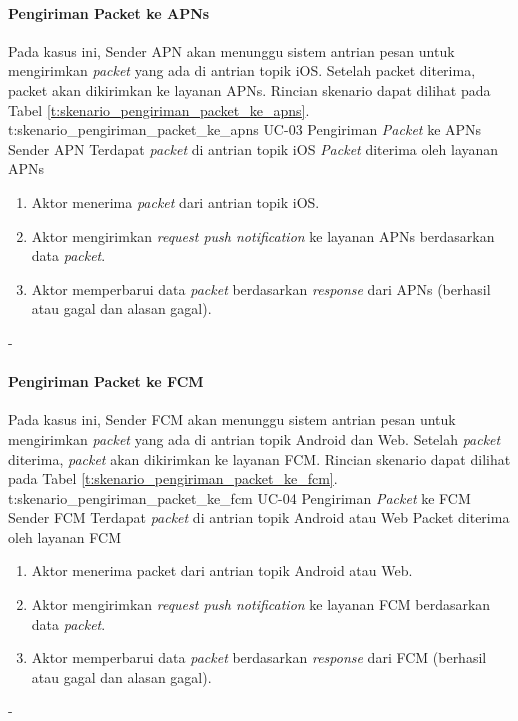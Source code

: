 \paragraph{Pengiriman Packet ke APNs}
\par Pada kasus ini, Sender APN akan menunggu sistem antrian pesan untuk mengirimkan \textit{packet} yang ada di antrian topik iOS. Setelah packet diterima, packet akan dikirimkan ke layanan APNs. Rincian skenario dapat dilihat pada Tabel \ref{t:skenario_pengiriman_packet_ke_apns}.
\tableUcDesc
{t:skenario_pengiriman_packet_ke_apns}
{UC-03}
{Pengiriman \textit{Packet} ke APNs}
{Sender APN}
{Terdapat \textit{packet} di antrian topik iOS}
{\textit{Packet} diterima oleh layanan APNs}
{
\begin{enumerate}
    \item Aktor menerima \textit{packet} dari antrian topik iOS.
    \item Aktor mengirimkan \textit{request push notification} ke layanan APNs berdasarkan data \textit{packet}.
    \item Aktor memperbarui data \textit{packet} berdasarkan \textit{response} dari APNs (berhasil atau gagal dan alasan gagal).
\end{enumerate}
}
{-}

\paragraph{Pengiriman Packet ke FCM}
\par Pada kasus ini, Sender FCM akan menunggu sistem antrian pesan untuk mengirimkan \textit{packet} yang ada di antrian topik Android dan Web. Setelah \textit{packet} diterima, \textit{packet} akan dikirimkan ke layanan FCM. Rincian skenario dapat dilihat pada Tabel \ref{t:skenario_pengiriman_packet_ke_fcm}.
\tableUcDesc
{t:skenario_pengiriman_packet_ke_fcm}
{UC-04}
{Pengiriman \textit{Packet} ke FCM}
{Sender FCM}
{Terdapat \textit{packet} di antrian topik Android atau Web}
{Packet diterima oleh layanan FCM}
{
\begin{enumerate}
    \item Aktor menerima packet dari antrian topik Android atau Web.
    \item Aktor mengirimkan \textit{request push notification} ke layanan FCM berdasarkan data \textit{packet}.
    \item Aktor memperbarui data \textit{packet} berdasarkan \textit{response} dari FCM (berhasil atau gagal dan alasan gagal).
\end{enumerate}
}
{-}

